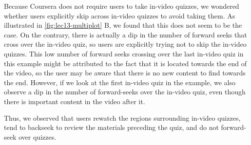 \documentclass{sigchi}
\begin{document}


Because Coursera does not require users to take in-video quizzes, we wondered whether users explicitly skip across in-video quizzes to avoid taking them. As illustrated in \autoref{fig:lec13-multiplot} B, we found that this does not seem to be the case. On the contrary, there is actually a dip in the number of forward seeks that cross over the in-video quiz, so users are explicitly trying not to skip the in-video quizzes. This low number of forward seeks crossing over the last in-video quiz in this example might be attributed to the fact that it is located towards the end of the video, so the user may be aware that there is no new content to find towards the end. However, if we look at the first in-video quiz in the example, we also observe a dip in the number of forward-seeks over the in-video quiz, even though there is important content in the video after it.

Thus, we observed that users rewatch the regions surrounding in-video quizzes, tend to backseek to review the materials preceding the quiz, and do not forward-seek over quizzes. %
\end{document}
